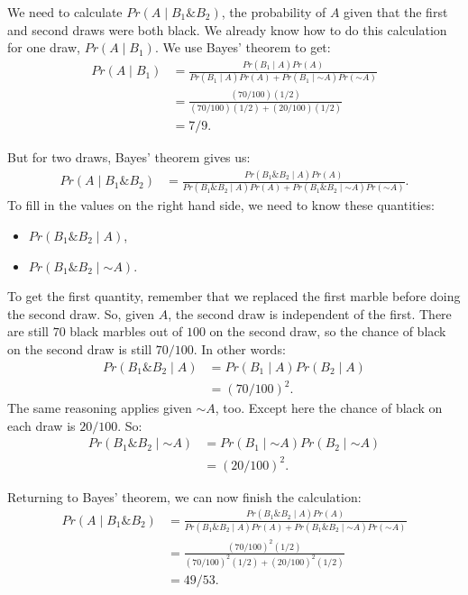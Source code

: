 \documentclass[justified]{tufte-book}
\providecommand{\tightlist}{%
  \setlength{\itemsep}{0pt}\setlength{\parskip}{0pt}}
\newcommand{\given}{\mid}
\renewcommand{\neg}{\mathbin{\sim}}
\renewcommand{\wedge}{\mathbin{\&}}
\newcommand{\p}{Pr}
\theoremstyle{definition}
\theoremstyle{definition}
\theoremstyle{definition}
\theoremstyle{remark}
\begin{document}
We need to calculate \(\p(A \given B_1 \wedge B_2)\), the probability of \(A\) given that the first and second draws were both black. We already know how to do this calculation for one draw, \(\p(A \given B_1)\). We use Bayes' theorem to get:
\[
  \begin{aligned}
    \p(A \given B_1) &= \frac{\p(B_1 \given A)\p(A)}{\p(B_1 \given A) \p(A) + \p(B_1 \given \neg A) \p(\neg A)} \\
      &= \frac{(70/100)(1/2)}{(70/100)(1/2) + (20/100)(1/2)}\\
      &= 7/9.
  \end{aligned}
\]

But for two draws, Bayes' theorem gives us:
\[
  \begin{aligned}
    \p(A \given B_1 \wedge B_2) &= \frac{\p(B_1 \wedge B_2 \given A)\p(A)}{\p(B_1 \wedge B_2 \given A) \p(A) + \p(B_1 \wedge B_2 \given \neg A) \p(\neg A)}.
  \end{aligned}
\]
To fill in the values on the right hand side, we need to know these quantities:

\begin{itemize}
\tightlist
\item
  \(\p(B_1 \wedge B_2 \given A)\),
\item
  \(\p(B_1 \wedge B_2 \given \neg A)\).
\end{itemize}

To get the first quantity, remember that we replaced the first marble before doing the second draw. So, given \(A\), the second draw is independent of the first. There are still \(70\) black marbles out of \(100\) on the second draw, so the chance of black on the second draw is still \(70/100\). In other words:
\[
  \begin{aligned}
    \p(B_1 \wedge B_2 \given A) &= \p(B_1 \given A) \p(B_2 \given A)\\
      &= (70/100)^2.
  \end{aligned}
\]
The same reasoning applies given \(\neg A\), too. Except here the chance of black on each draw is \(20/100\). So:
\[
  \begin{aligned}
    \p(B_1 \wedge B_2 \given \neg A) &= \p(B_1 \given \neg A) \p(B_2 \given \neg A)\\
      &= (20/100)^2.
  \end{aligned}
\]

Returning to Bayes' theorem, we can now finish the calculation:
\[
  \begin{aligned}
    \p(A \given B_1 \wedge B_2) &= \frac{\p(B_1 \wedge B_2 \given A)\p(A)}{\p(B_1 \wedge B_2 \given A) \p(A) + \p(B_1 \wedge B_2 \given \neg A) \p(\neg A)} \\ 
    &= \frac{(70/100)^2(1/2)}{(70/100)^2(1/2) + (20/100)^2(1/2)}\\
    &= 49/53.
  \end{aligned}
\]
\end{document}
